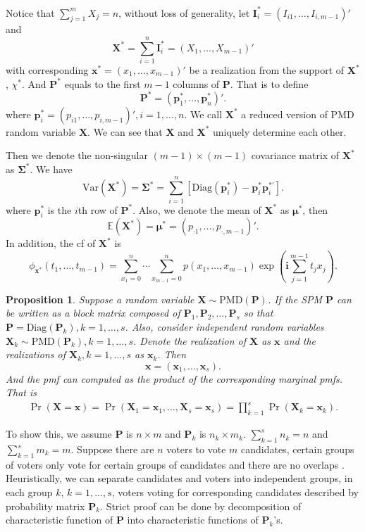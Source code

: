 \documentclass[12pt]{article}
\newcommand{\Sigmavec}{{\boldsymbol{\Sigma}}}
\newcommand{\Ivec}{{\boldsymbol{I}}}
\newcommand{\EE}{\mathbb{E}}
\newcommand{\Pmat}{\mathbf{P}}
\newcommand{\pvec}{\boldsymbol{p}}
\newcommand{\Var}{{\textrm{Var}}}
\newcommand{\ivec}{{\boldsymbol{i}}}
\newcommand{\diag}{\textrm{Diag}}
\newcommand{\PMD}{\textrm{PMD}}
\newcommand{\Xvec}{\boldsymbol{X}}
\newcommand{\xvec}{\boldsymbol{x}}
\newcommand{\muvec}{\boldsymbol{\mu}}
\newcommand{\Sig}{\boldsymbol{\Sigma}}
\newcommand{\qedw}{\hfill \ensuremath{\Box}}
\newtheorem{ppt}{Proposition}
\begin{document}
Notice that $\sum_{j=1}^{m}X_j = n$, without loss of generality, let $\Ivec_i^{\ast} = (I_{i1},\dots,I_{i,m-1})'$ and
 $$\Xvec^{\ast}=\sum_{i=1}^{n}\Ivec_{i}^{\ast}=(X_1,\dots,X_{m-1})'$$
  with corresponding $\xvec^{\ast} = (x_1,\dots,x_{m-1})'$ be a realization from the support of $\Xvec^{\ast}$, $\chi^{\ast}$. And $\Pmat^{\ast}$ equals to the first $m-1$ columns of $\Pmat$. That is to define
$$
\Pmat^{\ast} = \left(\pvec_1^{\ast},\dots, \pvec_n^{\ast} \right)'.
$$
where $\pvec_{i}^{\ast} = \left(p_{i1},\dots,p_{i,m-1} \right)', i = 1,\dots,n$. We call $\Xvec^{\ast}$ a reduced version of $\PMD$ random variable $\Xvec$. We can see that $\Xvec$ and $\Xvec^{\ast}$ uniquely determine each other.

Then we denote the non-singular $(m-1) \times (m-1)$ covariance matrix of $\Xvec^{\ast}$ as $\Sigmavec^{\ast}$. We have
 $$\Var(\Xvec^{\ast}) =\Sig^{\ast}=\sum_{i=1}^n[\diag(\pvec_i^{\ast})-\pvec_i^{\ast} \pvec_i^{\ast \prime} ].$$
where $\pvec_i^{\ast}$ is the $i$th row of $\Pmat^{\ast}$. Also, we denote the mean of $\Xvec^{\ast}$ as $\muvec^{\ast}$, then
  $$\EE(\Xvec^{\ast}) =\muvec^{\ast} = \left( p_{\cdot1} ,\dots,p_{\cdot,m-1}\right)'.$$
 In addition, the cf of $\Xvec^{\ast}$ is
 \begin{equation*}
\phi_{\xvec^{\ast}}(t_1, \dots, t_{m-1})  =  \sum_{x_1 = 0}^{n} \cdots \sum_{x_{m-1} = 0}^n p(x_1,\ldots,x_{m-1})\exp\left(\ivec\sum_{j=1}^{m-1}t_jx_j\right).
\end{equation*}

\begin{ppt}%
Suppose a random variable $\Xvec \sim \PMD(\Pmat)$. If the SPM $\Pmat$ can be written as a block matrix composed of $\Pmat_1, \Pmat_2, \dots, \Pmat_{s}$ so that $\Pmat = \diag(\Pmat_{k}), k=1,\dots,s$. Also, consider independent random variables $\Xvec_{k} \sim \PMD(\Pmat_{k}), k=1,\dots,s$. Denote the realization of $\Xvec$ as $\xvec$ and the realizations of $\Xvec_{k}, k=1,\dots,s$ as $\xvec_k$. Then
$$\xvec= (\xvec_{1},\dots,\xvec_{s}).$$
And the pmf can computed as the product of the corresponding marginal pmfs. That is
\begin{align*}
\Pr(\Xvec=\xvec)= \Pr(\Xvec_{1}=\xvec_{1}, \dots, \Xvec_{s}=\xvec_{s})= \prod_{k=1}^s \Pr(\Xvec_{k} = \xvec_{k}).
\end{align*}
\end{ppt}

To show this, we assume $\Pmat$ is $n \times m$ and $\Pmat_{k}$ is $n_k \times m_k$. $\sum_{k=1}^s n_k = n$ and $\sum_{k=1}^s m_k = m$. Suppose there are $n$ voters to vote $m$ candidates, certain groups of voters only vote for certain groups of candidates and there are no overlaps . Heuristically, we can separate candidates and voters into independent groups, in each group $k$, $k = 1,\dots,s$, voters voting for corresponding candidates described by probability matrix $\Pmat_{k}$. Strict proof can be done by decomposition of characteristic function of $\Pmat$ into characteristic functions of $\Pmat_{k}$'s.
\end{document}
